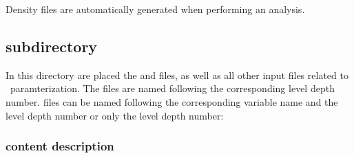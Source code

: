 \begin{center}
\end{center}


\btips

 Density files are automatically generated when performing an analysis.

\etips

\subsection[DIVA3D/divastripped/input/divaparam directory]{ subdirectory}

In this directory are placed the   and  files, as well as all other input files related to \diva\ paramterization. The   files are named following the corresponding level depth number.  files can be named following the  corresponding variable name and the level depth number or only the level depth number:


\begin{center}
\end{center}



\subsubsection[input/divaparam content description]{ content description}

